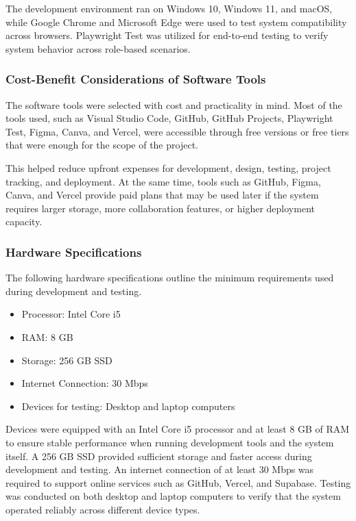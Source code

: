 The development environment ran on Windows 10, Windows 11, and macOS, while Google Chrome and Microsoft Edge were used to test system compatibility across browsers. Playwright Test was utilized for end-to-end testing to verify system behavior across role-based scenarios.

\subsubsection{Cost-Benefit Considerations of Software Tools}

The software tools were selected with cost and practicality in mind. Most of the tools used, such as Visual Studio Code, GitHub, GitHub Projects, Playwright Test, Figma, Canva, and Vercel, were accessible through free versions or free tiers that were enough for the scope of the project.

This helped reduce upfront expenses for development, design, testing, project tracking, and deployment. At the same time, tools such as GitHub, Figma, Canva, and Vercel provide paid plans that may be used later if the system requires larger storage, more collaboration features, or higher deployment capacity.

\subsubsection{Hardware Specifications}
The following hardware specifications outline the minimum requirements used during development and testing.

\begin{itemize}
  \item Processor: Intel Core i5
  \item RAM: 8 GB
  \item Storage: 256 GB SSD
  \item Internet Connection: 30 Mbps
  \item Devices for testing: Desktop and laptop computers
\end{itemize}

Devices were equipped with an Intel Core i5 processor and at least 8 GB of RAM to ensure stable performance when running development tools and the system itself. 
A 256 GB SSD provided sufficient storage and faster access during development and testing. An internet connection of at least 30 Mbps was required to support online services such as GitHub, Vercel, and Supabase. 
Testing was conducted on both desktop and laptop computers to verify that the system operated reliably across different device types.

